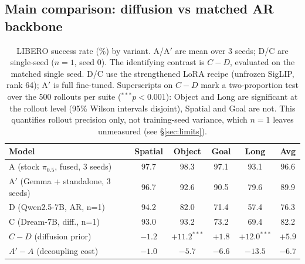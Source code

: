\documentclass{article}
\begin{document}
\subsection{Main comparison: diffusion vs matched AR backbone}
\label{sec:main}
\begin{table}[t]
\centering
\caption{LIBERO success rate (\%) by variant. A/A$'$ are mean over 3 seeds;
D/C are single-seed ($n{=}1$, seed 0). The identifying contrast is $C-D$,
evaluated on the matched single seed. D/C use the strengthened LoRA recipe
(unfrozen SigLIP, rank 64); A$'$ is full fine-tuned. Superscripts on $C-D$ mark a
two-proportion test over the 500 rollouts per suite ($^{\ast\ast\ast}p<0.001$):
Object and Long are significant at the rollout level (95\% Wilson intervals
disjoint), Spatial and Goal are not. This quantifies rollout precision only, not
training-seed variance, which $n{=}1$ leaves unmeasured (see \S\ref{sec:limits}).}
\begin{tabular}{lccccc}
\toprule
Model & Spatial & Object & Goal & Long & Avg \\
\midrule
A (stock $\pi_{0.5}$, fused, 3 seeds) & 97.7 & 98.3 & 97.1 & 93.1 & 96.6 \\
A$'$ (Gemma + standalone, 3 seeds)    & 96.7 & 92.6 & 90.5 & 79.6 & 89.9 \\
D (Qwen2.5-7B, AR, n{=}1)             & 94.2 & 82.0 & 71.4 & 57.4 & 76.3 \\
C (Dream-7B, diff., n{=}1)   & 93.0 & 93.2 & 73.2 & 69.4 & 82.2 \\
\midrule
$C-D$ (diffusion prior)      & $-1.2$ & $+11.2^{\ast\ast\ast}$ & $+1.8$ & $+12.0^{\ast\ast\ast}$ & $+5.9$ \\
$A'\!-\!A$ (decoupling cost) & $-1.0$ & $-5.7$ & $-6.6$ & $-13.5$ & $-6.7$ \\
\bottomrule
\end{tabular}
\end{table}
\end{document}
